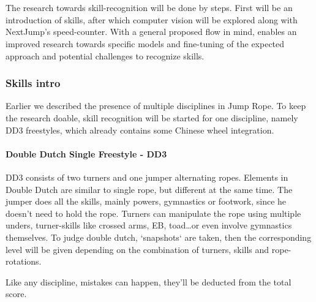 \chapter{}%
\label{ch:stand-van-zaken}



The research towards skill-recognition will be done by steps. First will be an introduction of skills, after which computer vision will be explored along with NextJump's speed-counter. With a general proposed flow in mind, enables an improved research towards specific models and fine-tuning of the expected approach and potential challenges to recognize skills.

\subsection{Skills intro}
\label{subsec:literature-basisskills}

Earlier we described the presence of multiple disciplines in Jump Rope. To keep the research doable, skill recognition will be started for one discipline, namely DD3 freestyles, which already contains some Chinese wheel integration.

\subsubsection{Double Dutch Single Freestyle - DD3}
\label{subsubsec:literature-dd3}

DD3 consists of two turners and one jumper alternating ropes. Elements in Double Dutch are similar to single rope, but different at the same time. The jumper does all the skills, mainly powers, gymnastics or footwork, since he doesn't need to hold the rope. Turners can manipulate the rope using multiple unders, turner-skills like crossed arms, EB, toad\dots or even involve gymnastics themselves.
To judge double dutch, `snapshots` are taken, then the corresponding level will be given depending on the combination of turners, skills and rope-rotations.

Like any discipline, mistakes can happen, they'll be deducted from the total score.

